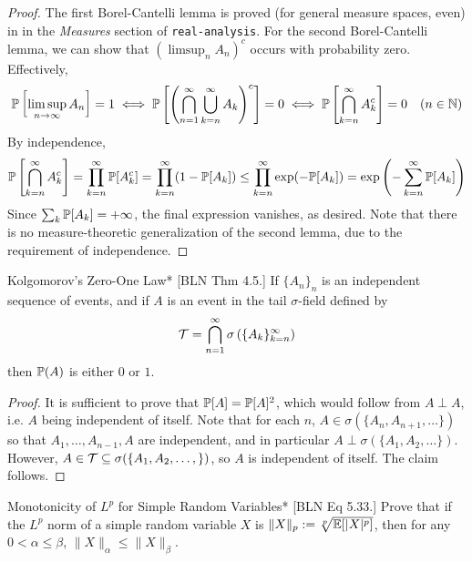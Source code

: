\begin{proof}
    The first Borel-Cantelli lemma is proved (for general measure spaces, even) in in the \emph{Measures} section of \texttt{real-analysis}. For the second Borel-Cantelli lemma, we can show that \((\limsup_n A_n)^c\) occurs with probability zero. Effectively,
    \[
        \mathbb{P}\left[\limsup_{n \to \infty} A_n\right] = 1
        \iff \mathbb{P}\left[ \left(\bigcap_{n=1}^\infty \bigcup_{k=n}^\infty A_k\right)^c \right] = 0
        \iff \mathbb{P}\left[ \bigcap_{k=n}^\infty A_k^c \right] = 0
        \quad (n \in \mathbb{N})
    \]
    By independence,
    \[
        \mathbb{P}\left[ \bigcap_{k =n}^\infty A_k^c \right]
        = \prod_{k=n}^\infty \mathbb{P}[A_k^c]
        = \prod_{k=n}^\infty (1 - \mathbb{P}[A_k])
        \leq \prod_{k=n}^\infty \exp(-\mathbb{P}[A_k])
        = \exp\left( -\sum_{k=n}^\infty \mathbb{P}[A_k] \right)
    \]
    Since \(\sum_k \mathbb{P}[A_k] = +\infty\), the final expression vanishes, as desired. Note that there is no measure-theoretic generalization of the second lemma, due to the requirement of independence.
\end{proof}


\begin{problem}{Kolgomorov's Zero-One Law}*
    [BLN Thm 4.5.] If \(\{A_n\}_n\) is an independent sequence of events, and if \(A\) is an event in the tail \(\sigma\)-field defined by
    \[
        \mathcal{T} = \bigcap_{n=1}^\infty \sigma \left( \{A_k\}_{k=n}^\infty \right)
    \]
    then \(\mathbb{P}(A)\) is either \(0\) or \(1\).
\end{problem}

\begin{proof}
    It is sufficient to prove that \(\mathbb{P}[A] = \mathbb{P}[A]^2\), which would follow from \(A \perp A\), i.e. \(A\) being independent of itself. Note that for each \(n\), \(A \in \sigma(\{A_n, A_{n+1}, \dots\})\) so that \(A_1, \dots, A_{n-1}, A\) are independent, and in particular \(A \perp \sigma(\{A_1, A_2, \dots \})\). However, \(A \in \mathcal{T} \subseteq \sigma(\{A_1, A_2, \dots, \})\), so \(A\) is independent of itself. The claim follows. 
\end{proof}


\begin{problem}{Monotonicity of \(L^p\) for Simple Random Variables}*
    [BLN Eq 5.33.] Prove that if the \(L^p\) norm of a simple random variable \(X\) is \(\|X\|_p := \sqrt[p]{\mathbb{E}[|X|^p]}\), then for any \(0 < \alpha \leq \beta\), \(\|X\|_\alpha \leq \|X\|_\beta\).
\end{problem}


